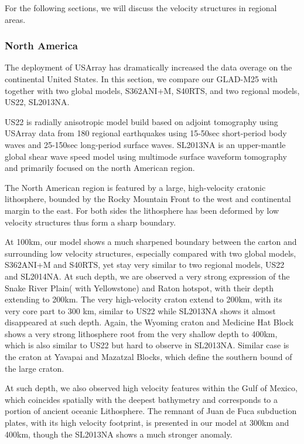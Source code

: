 \documentclass[extra,mreferee]{gji}
\begin{document}
For the following sections, we will discuss the velocity structures in regional
areas.

\subsubsection{North America}
The deployment of USArray has dramatically increased the data overage on the
continental United States. In this section, we compare our GLAD-M25 with
together with two global models, S362ANI+M, S40RTS, and two regional models,
US22\citep{zhu2017radial}, SL2013NA\citep{schaeffer2014imaging}.

US22 is radially anisotropic model build based on adjoint tomography using
USArray data from 180 regional earthquakes using 15-50sec short-period
body waves and 25-150sec long-period surface waves.
SL2013NA is an upper-mantle global shear wave speed model using multimode
surface waveform tomography and primarily focused on the north American
region.

The North American region is featured by a large, high-velocity cratonic
lithosphere, bounded by the Rocky Mountain Front to the west and continental
margin to the east. For both sides the lithosphere has been deformed by
low velocity structures thus form a sharp boundary.

At 100km, our model shows a much sharpened boundary between the carton
and surrounding low velocity structures, especially compared with
two global models, S362ANI+M and S40RTS, yet stay very similar to
two regional models, US22 and SL2014NA. At such depth,
we are observed a very strong expression of the Snake River Plain(
with Yellowstone) and Raton hotspot, with their depth extending to 200km.
The very high-velocity craton extend to 200km, with its very core part to
300 km, similar to US22 while SL2013NA shows it almost disappeared at such depth.
Again, the Wyoming craton and Medicine Hat Block shows a very strong lithosphere
root from the very shallow depth to 400km, which is also similar to US22 but
hard to observe in SL2013NA. Similar case is the craton at Yavapai and
Mazatzal Blocks, which define the southern bound of the large craton.

At such depth, we also observed high velocity
features within the Gulf of Mexico, which coincides spatially with the deepest
bathymetry and corresponds to a portion of ancient oceanic
Lithosphere\citep{muller2008}. The remnant of Juan de Fuca subduction
plates, with its high velocity footprint, is presented in our model at
300km and 400km, though the SL2013NA shows a much stronger anomaly.
\end{document}
